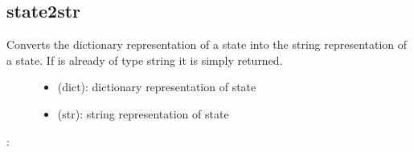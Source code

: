\documentclass[letterpaper,10pt,english]{sphinxmanual}
\begin{document}
\subsection{state2str}
\label{\detokenize{StateTransitionGraphs:state2str}}\label{\detokenize{StateTransitionGraphs:id9}}

\begin{fulllineitems}
\label{\detokenize{StateTransitionGraphs:PyBoolNet.StateTransitionGraphs.state2str}}
Converts the dictionary representation of a state into the string representation of a state.
If  is already of type string it is simply returned.
\begin{description}
\item[{}] \leavevmode\begin{itemize}
\item {} 
 (dict): dictionary representation of state

\end{itemize}

\item[{}] \leavevmode\begin{itemize}
\item {} 
 (str): string representation of state

\end{itemize}

\end{description}

:

\begin{sphinxVerbatim}[commandchars=\\\{\}]
    
 
\end{sphinxVerbatim}

\end{fulllineitems}
\end{document}
